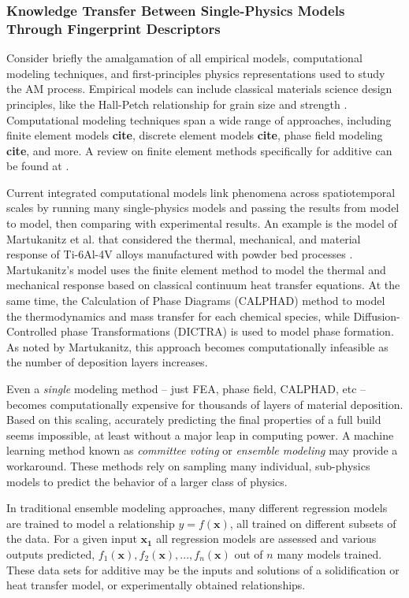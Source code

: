 \subsubsection{Knowledge Transfer Between Single-Physics Models Through Fingerprint Descriptors}
Consider briefly the amalgamation of all empirical models, computational modeling techniques, and first-principles physics representations used to study the AM process. Empirical models can include classical materials science design principles, like the Hall-Petch relationship for grain size and strength \cite{Martin2017}. Computational modeling techniques span a wide range of approaches, including finite element models \textbf{cite}, discrete element models \textbf{cite}, phase field modeling \textbf{cite}, and more. A review on finite element methods specifically for additive can be found at \cite{Gouge2018}.

Current integrated computational models link phenomena across spatiotemporal scales by running many single-physics models and passing the results from model to model, then comparing with experimental results. An example is the model of Martukanitz et al. that considered the thermal, mechanical, and material response of Ti-6Al-4V alloys manufactured with powder bed processes \cite{Martukanitz2014}. Martukanitz's model uses the finite element method to model the thermal and mechanical response based on classical continuum heat transfer equations. At the same time, the Calculation of Phase Diagrams (CALPHAD) method to model the thermodynamics and mass transfer for each chemical species, while Diffusion-Controlled phase Transformations (DICTRA) is used to model phase formation. As noted by Martukanitz, this approach becomes computationally infeasible as the number of deposition layers increases.

Even a \textit{single} modeling method -- just FEA, phase field, CALPHAD, etc -- becomes computationally expensive for thousands of layers of material deposition. Based on this scaling, accurately predicting the final properties of a full build seems impossible, at least without a major leap in computing power. A machine learning method known as \textit{committee voting} or \textit{ensemble modeling} may provide a workaround. These methods rely on sampling many individual, sub-physics models to predict the behavior of a larger class of physics.

In traditional ensemble modeling approaches, many different regression models are trained to model a relationship $y = f(\mathbf{x})$, all trained on different subsets of the data. For a given input $\mathbf{x_1}$ all regression models are assessed and various outputs predicted, $f_1(\mathbf{x}), f_2(\mathbf{x}), ..., f_n(\mathbf{x})$ out of $n$ many models trained. These data sets for additive may be the inputs and solutions of a solidification or heat transfer model, or experimentally obtained relationships.

